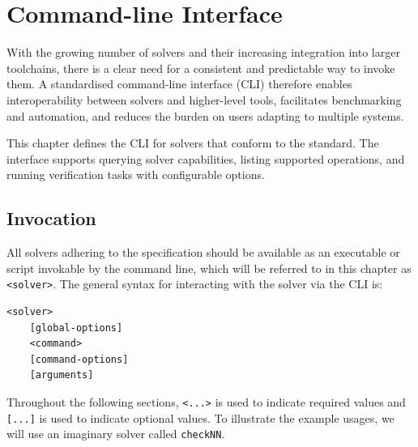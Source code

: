\chapter{Command-line Interface}
\label{sec:solver_interface}

\newcommand{\clOutputOption}[3]{
\paragraph{\texttt{#1}}
\begin{itemize}
    \item \textbf{Description}: #2
    \item \textbf{Output}: #3
    \item \textbf{Example usage}:
\end{itemize}
}

\newcommand{\clOption}[3]{
\paragraph{\texttt{#1}}
\begin{itemize}
    \item \textbf{Description}: #2
    \item \textbf{Example usage}: \texttt{#3}
\end{itemize}
}


\newcommand{\exampleSolver}{checkNN}

With the growing number of solvers and their increasing integration into larger toolchains, there is a clear need for a consistent and predictable way to invoke them. A standardised command-line interface (CLI) therefore enables interoperability between solvers and higher-level tools, facilitates benchmarking and automation, and reduces the burden on users adapting to multiple systems.

This chapter defines the CLI for solvers that conform to the \vnnlib{} standard. The interface supports querying solver capabilities, listing supported operations, and running verification tasks with configurable options.

\section{Invocation}

All solvers adhering to the \vnnlib{} specification should be available as an executable or script invokable by the command line, which will be referred to in this chapter as \texttt{<solver>}. The general syntax for interacting with the solver via the CLI is:
\begin{lstlisting}[style=bash]
<solver>
    [global-options] 
    <command> 
    [command-options] 
    [arguments] 
\end{lstlisting}
Throughout the following sections, \texttt{<...>} is used to indicate required values and \texttt{[...]} is used to indicate optional values. To illustrate the example usages, we will  use an imaginary solver called \texttt{\exampleSolver}.

